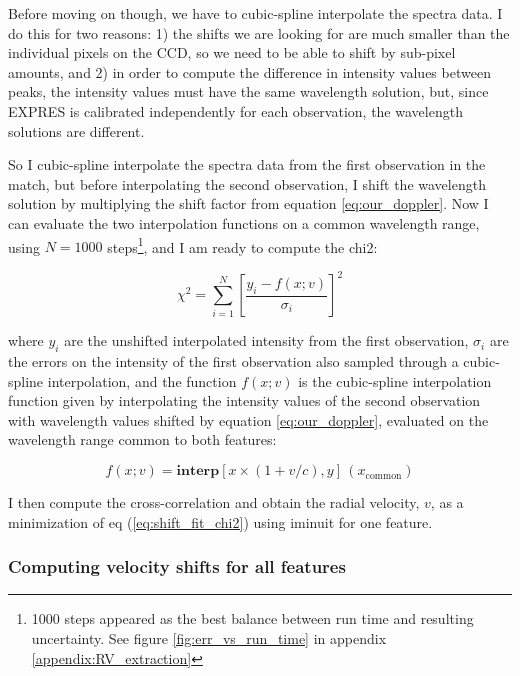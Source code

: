     Before moving on though, we have to cubic-spline interpolate the spectra data. I do this for two reasons: 1) the shifts we are looking for are much smaller than the individual pixels on the CCD, so we need to be able to shift by sub-pixel amounts, and 2) in order to compute the difference in intensity values between peaks, the intensity values must have the same wavelength solution, but, since EXPRES is calibrated independently for each observation, the wavelength solutions are different.
    
    So I cubic-spline interpolate the spectra data from the first observation in the match, but before interpolating the second observation, I shift the wavelength solution by multiplying the shift factor from equation \ref{eq:our_doppler}. Now I can evaluate the two interpolation functions on a common wavelength range, using $N=1000$ steps\footnote{1000 steps appeared as the best balance between run time and resulting uncertainty. See figure \ref{fig:err_vs_run_time} in appendix \ref{appendix:RV_extraction}}, and I am ready to compute the chi2:
        
    \begin{equation}
        \label{eq:shift_fit_chi2}
        \chi^{2}=\sum_{i=1}^{N}\left[\frac{y_{i}-f(x; v)}{\sigma_{i}}\right]^{2}
    \end{equation}
    
    where $y_i$ are the unshifted interpolated intensity from the first observation, $\sigma_i$ are the errors on the intensity of the first observation also sampled through a cubic-spline interpolation, and the function $f(x; v)$ is the cubic-spline interpolation function given by interpolating the intensity values of the second observation with wavelength values shifted by equation \ref{eq:our_doppler}, evaluated on the wavelength range common to both features: 
    
    \begin{equation}
        f(x; v) = \textbf{interp}[x \times ( 1 + v/c), y]\,(x_\text{common})
    \end{equation}
    
    I then compute the cross-correlation and obtain the radial velocity, $v$, as a minimization of eq (\ref{eq:shift_fit_chi2}) using iminuit for one feature. 
    
    \subsubsection{Computing velocity shifts for all features}

